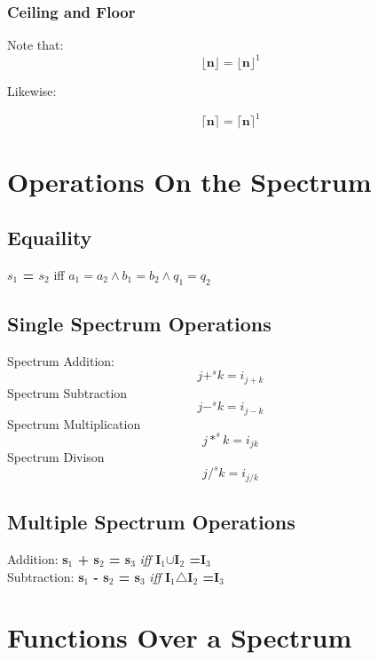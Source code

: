 \documentclass[12pt]{scrreprt}
\begin{document}
\subsection{Ceiling and Floor}
Note that: \begin{equation}
\textbf{$\lfloor$n$\rfloor$} = \textbf{$\lfloor$n$\rfloor^1$} 
\end{equation}
\begin{center}
Likewise:\end{center}
 \begin{equation}
\textbf{$\lceil$n$\rceil$} = \textbf{$\lceil$n$\rceil^1$} 
\end{equation}
\chapter{Operations On the Spectrum}
\section{Equaility}
\textbf{$s_1$ = $s_2$} iff \textbf{$a_1 = a_2 \wedge b_1=b_2 \wedge q_1 = q_2$}
\section{Single Spectrum Operations}
Spectrum Addition: 
\begin{equation} j +^s k = i_{j+k}
\end{equation}
Spectrum Subtraction
\begin{equation} j -^s k = i_{j-k}
\end{equation}
Spectrum Multiplication
\begin{equation} j*^s k = i_{jk}
\end{equation}
Spectrum Divison 
\begin{equation} j /^s k = i_{j/k}
\end{equation}
\section{Multiple Spectrum Operations}
Addition:
\textbf{s$_1$ + s$_2$ = s$_3$} \textit{iff} \textbf{I$_1$$\cup$I$_2$ =I$_3$}
\\Subtraction:
\textbf{s$_1$ - s$_2$ = s$_3$} \textit{iff} \textbf{I$_1$$\triangle$I$_2$ =I$_3$}
 
\chapter{Functions Over a Spectrum}
\end{document}

